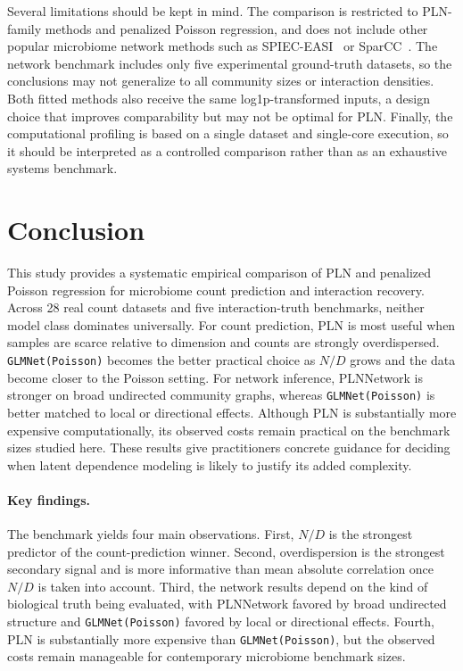 \documentclass{jmlr}
\begin{document}
Several limitations should be kept in mind.
The comparison is restricted to PLN-family methods and penalized Poisson regression, and does not include other popular microbiome network methods such as SPIEC-EASI~\citep{Kurtz2015SPIECEASI} or SparCC~\citep{Friedman2012SparCC}.
The network benchmark includes only five experimental ground-truth datasets, so the conclusions may not generalize to all community sizes or interaction densities.
Both fitted methods also receive the same log1p-transformed inputs, a design choice that improves comparability but may not be optimal for PLN.
Finally, the computational profiling is based on a single dataset and single-core execution, so it should be interpreted as a controlled comparison rather than as an exhaustive systems benchmark.

\section{Conclusion}
\label{sec:conclusion}

This study provides a systematic empirical comparison of PLN and penalized Poisson regression for microbiome count prediction and interaction recovery.
Across 28 real count datasets and five interaction-truth benchmarks, neither model class dominates universally.
For count prediction, PLN is most useful when samples are scarce relative to dimension and counts are strongly overdispersed.
\texttt{GLMNet(Poisson)} becomes the better practical choice as $N/D$ grows and the data become closer to the Poisson setting.
For network inference, PLNNetwork is stronger on broad undirected community graphs, whereas \texttt{GLMNet(Poisson)} is better matched to local or directional effects.
Although PLN is substantially more expensive computationally, its observed costs remain practical on the benchmark sizes studied here.
These results give practitioners concrete guidance for deciding when latent dependence modeling is likely to justify its added complexity.

\paragraph{Key findings.}
The benchmark yields four main observations.
First, $N/D$ is the strongest predictor of the count-prediction winner.
Second, overdispersion is the strongest secondary signal and is more informative than mean absolute correlation once $N/D$ is taken into account.
Third, the network results depend on the kind of biological truth being evaluated, with PLNNetwork favored by broad undirected structure and \texttt{GLMNet(Poisson)} favored by local or directional effects.
Fourth, PLN is substantially more expensive than \texttt{GLMNet(Poisson)}, but the observed costs remain manageable for contemporary microbiome benchmark sizes.
\end{document}
